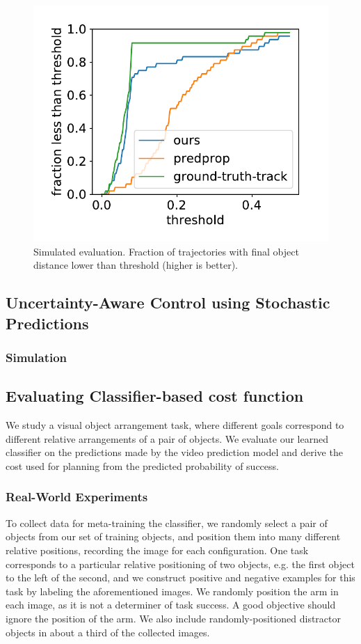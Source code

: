 \begin{figure}
\centering
\includegraphics[width=0.4\columnwidth]{images_rfr/2obj_scores_ours-predprop-ground-truth-track.pdf}
\caption{\small{Simulated evaluation. Fraction of trajectories with final object distance lower than threshold (higher is better).}}
\label{fig:sim_bench}
\end{figure}

\subsection{Uncertainty-Aware Control using Stochastic Predictions}
\subsubsection{Simulation}


\subsection{Evaluating Classifier-based cost function}

We study a visual object arrangement task, where different goals correspond to different relative arrangements of a pair of objects. We evaluate our learned classifier on the predictions made by the video prediction model and derive the cost used for planning from the predicted probability of success.

\subsubsection{Real-World Experiments}

To collect data for meta-training the classifier, we randomly select a pair of objects from our set of training objects, and position them into many different relative positions, recording the image for each configuration. One task corresponds to a particular relative positioning of two objects, e.g. the first object to the left of the second, and we construct positive and negative examples for this task by labeling the aforementioned images. We randomly position the arm in each image, as it is not a determiner of task success. A good objective should ignore the position of the arm. We also include randomly-positioned distractor objects in about a third of the collected images.

